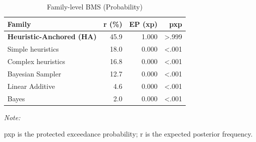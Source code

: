 \begin{table}[!h]
\centering
\caption{Family-level BMS (Probability)}
\centering
\begin{threeparttable}
\begin{tabular}[t]{lrrr}
\toprule
Family & r (\%) & EP (xp) & pxp\\
\midrule
\textbf{Heuristic-Anchored (HA)} & 45.9 & 1.000 & >.999\\
Simple heuristics & 18.0 & 0.000 & <.001\\
Complex heuristics & 16.8 & 0.000 & <.001\\
Bayesian Sampler & 12.7 & 0.000 & <.001\\
Linear Additive & 4.6 & 0.000 & <.001\\
Bayes & 2.0 & 0.000 & <.001\\
\bottomrule
\end{tabular}
\begin{tablenotes}
\item \textit{Note: } 
\item pxp is the protected exceedance probability; r is the expected posterior frequency.
\end{tablenotes}
\end{threeparttable}
\end{table}
